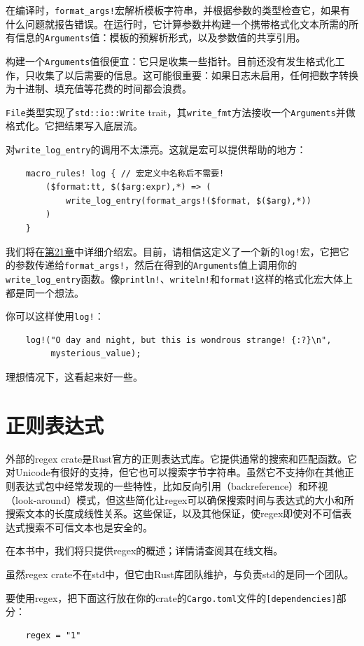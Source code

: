 在编译时，\texttt{format\_args!}宏解析模板字符串，并根据参数的类型检查它，如果有什么问题就报告错误。在运行时，它计算参数并构建一个携带格式化文本所需的所有信息的\texttt{Arguments}值：模板的预解析形式，以及参数值的共享引用。

构建一个\texttt{Arguments}值很便宜：它只是收集一些指针。目前还没有发生格式化工作，只收集了以后需要的信息。这可能很重要：如果日志未启用，任何把数字转换为十进制、填充值等花费的时间都会浪费。

\texttt{File}类型实现了\texttt{std::io::Write} trait，其\texttt{write\_fmt}方法接收一个\texttt{Arguments}并做格式化。它把结果写入底层流。

对\texttt{write\_log\_entry}的调用不太漂亮。这就是宏可以提供帮助的地方：
\begin{verbatim}
    macro_rules! log { // 宏定义中名称后不需要!
        ($format:tt, $($arg:expr),*) => (
            write_log_entry(format_args!($format, $($arg),*))
        )
    }
\end{verbatim}

我们将在\hyperref[ch21]{第21章}中详细介绍宏。目前，请相信这定义了一个新的\texttt{log!}宏，它把它的参数传递给\texttt{format\_args!}，然后在得到的\texttt{Arguments}值上调用你的\texttt{write\_log\_entry}函数。像\texttt{println!}、\texttt{writeln!}和\texttt{format!}这样的格式化宏大体上都是同一个想法。

你可以这样使用\texttt{log!}：
\begin{verbatim}
    log!("O day and night, but this is wondrous strange! {:?}\n",
         mysterious_value);
\end{verbatim}

理想情况下，这看起来好一些。
\section{正则表达式}

外部的regex crate是Rust官方的正则表达式库。它提供通常的搜索和匹配函数。它对Unicode有很好的支持，但它也可以搜索字节字符串。虽然它不支持你在其他正则表达式包中经常发现的一些特性，比如反向引用（backreference）和环视（look-around）模式，但这些简化让regex可以确保搜索时间与表达式的大小和所搜索文本的长度成线性关系。这些保证，以及其他保证，使regex即使对不可信表达式搜索不可信文本也是安全的。

在本书中，我们将只提供regex的概述；详情请查阅其在线文档。

虽然regex crate不在std中，但它由Rust库团队维护，与负责std的是同一个团队。

要使用regex，把下面这行放在你的crate的\texttt{Cargo.toml}文件的\texttt{[dependencies]}部分：
\begin{verbatim}
    regex = "1"
\end{verbatim}

